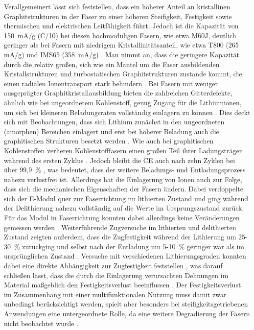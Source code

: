 Verallgemeinert lässt sich feststellen, dass ein höherer Anteil an kristallinen Graphitstrukturen in der Faser zu einer höheren Steifigkeit, Festigkeit sowie thermischen und elektrischen Leitfähigkeit führt. Jedoch ist die Kapazität von 150~$\si{\mA\per\g}$ (C/10) bei diesen hochmoduligen Fasern, wie etwa M60J, deutlich geringer als bei Fasern mit niedrigem Kristallinitätsanteil, wie etwa T800 (265~$\si{\mA\per\g}$) und IMS65 (358~$\si{\mA\per\g}$) \cite{Fredi2018}. Man nimmt an, dass die geringere Kapazität durch die relativ großen, sich wie ein Mantel um die Faser ausbildenden Kristallstrukturen und turbostatischen Graphitstrukturen zustande kommt, die einen radialen Ionentransport stark behindern \cite{Zenkert2024}. Bei Fasern mit weniger ausgeprägter Graphitkristallausbildung bieten die zahlreichen Gitterdefekte, ähnlich wie bei ungeordnetem Kohlenstoff, genug Zugang für die Lithiumionen, um sich bei kleineren Beladungsraten vollständig einlagern zu können \cite{Fredi2018}. Dies deckt sich mit Beobachtungen, dass sich Lithium zunächst in den ungeordneten (amorphen) Bereichen einlagert und erst bei höherer Beladung auch die graphitischen Strukturen besetzt werden \cite{Fang2022}. Wie auch bei graphitischen Kohlenstoffen verlieren Kohlenstofffasern einen großen Teil ihrer Ladungsträger während des ersten Zyklus \cite{Jacques2013}. Jedoch bleibt die CE auch nach zehn Zyklen bei über 99,9~\% \cite{Hagberg2016}, was bedeutet, dass der weitere Beladungs- und Entladungsprozess nahezu verlustfrei ist. Allerdings hat die Einlagerung von Ionen auch zur Folge, dass sich die mechanischen Eigenschaften der Fasern ändern. Dabei verdoppelte sich der E-Modul quer zur Faserrichtung im lithierten Zustand und ging während der Delithierung nahezu vollständig auf die Werte im Ursprungszustand zurück. Für das Modul in Faserrichtung konnten dabei allerdings keine Veränderungen gemessen werden \cite{Duan2021}. Weiterführende Zugversuche im lithierten und delithierten Zustand zeigten außerdem, dass die Zugfestigkeit während der Lithierung um 25-30~\% zurückging und selbst nach der Entladung um 5-10~\% geringer war als im ursprünglichen Zustand \cite{Jacques2012}. Versuche mit verschiedenen Lithierungsgraden konnten dabei eine direkte Abhängigkeit zur Zugfestigkeit feststellen \cite{Jacques2014}, was darauf schließen lässt, dass die durch die Einlagerung verursachten Dehnungen im Material maßgeblich den Festigkeitsverlust beeinflussen \cite{Zenkert2024}. Der Festigkeitsverlust im Zusammenhang mit einer multifunktionalen Nutzung muss damit zwar unbedingt berücksichtigt werden, spielt aber besonders bei steifigkeitsgetriebenen Anwendungen eine untergeordnete Rolle, da eine weitere Degradierung der Fasern nicht beobachtet wurde \cite{Zenkert2024}.

